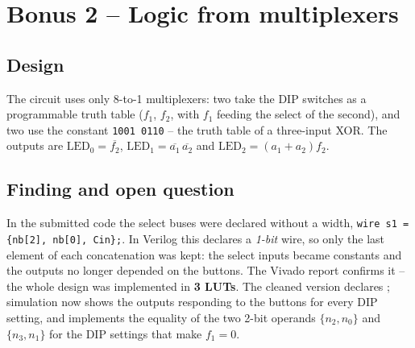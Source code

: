 \section{Bonus 2 -- Logic from multiplexers}
\subsection{Design}
The circuit uses only 8-to-1 multiplexers: two take the DIP switches as a programmable truth table
($f_1$, $f_2$, with $f_1$ feeding the select of the second), and two use the constant
\texttt{1001\,0110} -- the truth table of a three-input XOR. The outputs are
$\text{LED}_0=\overline{f_2}$, $\text{LED}_1=\overline{a_1}\,\overline{a_2}$ and
$\text{LED}_2=(a_1+a_2)f_2$.

\subsection{Finding and open question}
In the submitted code the select buses were declared without a width,
\texttt{wire s1 = \{nb[2], nb[0], Cin\};}. In Verilog this declares a \emph{1-bit} wire, so only the last
element of each concatenation was kept: the select inputs became constants and the outputs no longer
depended on the buttons. The Vivado report confirms it -- the whole design was implemented in
\textbf{3 LUTs}. The cleaned version declares ; simulation now shows the outputs
responding to the buttons for every DIP setting, and  implements the equality of the two
2-bit operands $\{n_2,n_0\}$ and $\{n_3,n_1\}$ for the DIP settings that make $f_1=0$.


